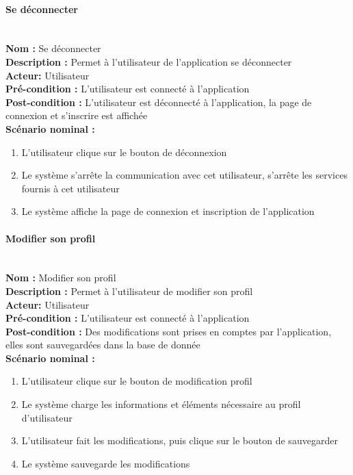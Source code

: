 \documentclass[12pt]{article}
\begin{document}
\paragraph{Se déconnecter}
\leavevmode \\
\textbf{Nom :} Se déconnecter\\
\textbf{Description :} Permet à l'utilisateur de l'application se déconnecter\\
\textbf{Acteur: } Utilisateur\\
\textbf{Pré-condition : } L'utilisateur est connecté à l'application \\
\textbf{Post-condition : } L'utilisateur est déconnecté à l'application, la page de connexion et s'inscrire est affichée\\
\textbf{Scénario nominal : }
\begin{enumerate}
    \item L'utilisateur clique sur le bouton de déconnexion
    \item Le système s'arrête la communication avec cet utilisateur, s'arrête les services fournis à cet utilisateur
    \item Le système affiche la page de connexion et inscription de l'application
\end{enumerate}


\paragraph{Modifier son profil}
\leavevmode \\
\textbf{Nom :} Modifier son profil\\
\textbf{Description :} Permet à l'utilisateur de modifier son profil\\
\textbf{Acteur: } Utilisateur\\
\textbf{Pré-condition : } L'utilisateur est connecté à l'application \\
\textbf{Post-condition : } Des modifications sont prises en comptes par l'application, elles sont sauvegardées dans la base de donnée\\
\textbf{Scénario nominal : }
\begin{enumerate}
    \item L'utilisateur clique sur le bouton de modification profil
    \item Le système charge les informations et éléments nécessaire au profil d'utilisateur
    \item L'utilisateur fait les modifications, puis clique sur le bouton de sauvegarder
    \item Le système sauvegarde les modifications
\end{enumerate}
\end{document}
